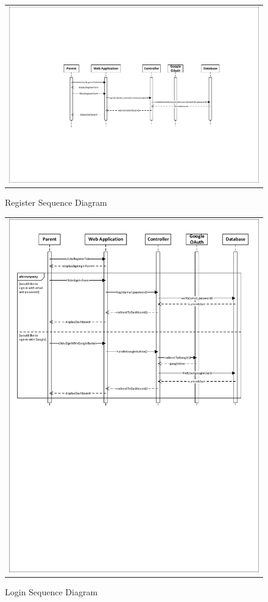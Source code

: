\documentclass{sprawozdanie-agh}
\begin{document}
			\begin{figure}[H] 
				\centering
				\begin{tabular}{c}
					\includegraphics[width=.95\textwidth]{registerSequenceDiagram}
				\end{tabular} 
				\caption{Register Sequence Diagram}
			\end{figure}
		
			\begin{figure}[H] 
				\centering
				\begin{tabular}{c}
					\includegraphics[width=.95\textwidth]{loginSequenceDiagram}
				\end{tabular} 
				\caption{Login Sequence Diagram}
			\end{figure}
		
\end{document}
